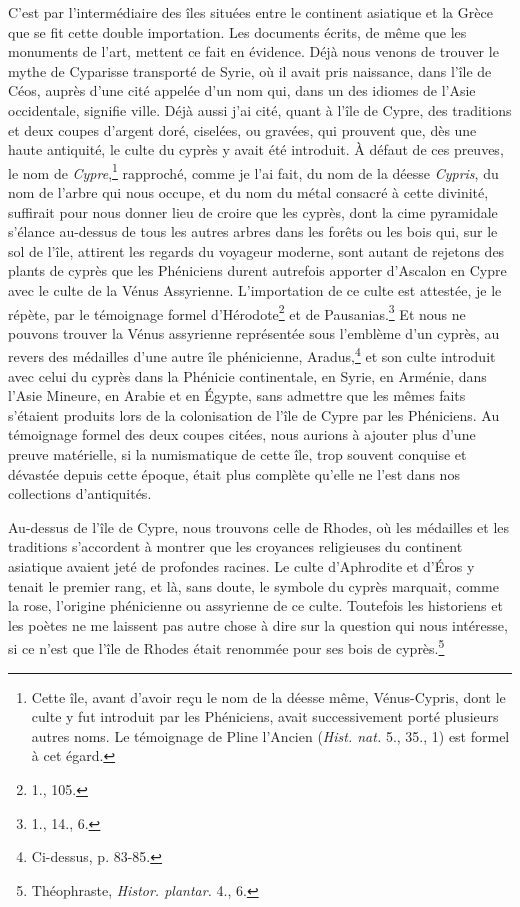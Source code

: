 \documentclass{article}
\begin{document}
C'est par l'intermédiaire des îles situées entre le continent asiatique et la Grèce que se fit cette double importation. Les documents écrits, de même que les monuments de l'art, mettent ce fait en évidence. Déjà nous venons de trouver le mythe de Cyparisse transporté de Syrie, où il avait pris naissance, dans l'île de Céos, auprès d'une cité appelée d'un nom qui, dans un des idiomes de l'Asie occidentale, signifie ville. Déjà aussi j'ai cité, quant à l'île de Cypre, des traditions et deux coupes d'argent doré, ciselées, ou gravées, qui prouvent que, dès une haute antiquité, le culte du cyprès y avait été introduit. À défaut de ces preuves, le nom de \emph{Cypre},\footnote{Cette île, avant d'avoir reçu le nom de la déesse même, Vénus-Cypris, dont le culte y fut introduit par les Phéniciens, avait successivement porté plusieurs autres noms. Le témoignage de Pline l'Ancien (\emph{Hist. nat.} 5., 35., 1) est formel à cet égard.} rapproché, comme je l'ai fait, du nom de la déesse \emph{Cypris}, du nom de l'arbre qui nous occupe, et du nom du métal consacré à cette divinité, suffirait pour nous donner lieu de croire que les cyprès, dont la cime pyramidale s'élance au-dessus de tous les autres arbres dans les forêts ou les bois qui, sur le sol de l'île, attirent les regards du voyageur moderne, sont autant de rejetons des plants de cyprès que les Phéniciens durent autrefois apporter d'Ascalon en Cypre avec le culte de la Vénus Assyrienne. L'importation de ce culte est attestée, je le répète, par le témoignage formel d'Hérodote\footnote{1., 105.} et de Pausanias.\footnote{1., 14., 6.} Et nous ne pouvons trouver la Vénus assyrienne représentée sous l'emblème d'un cyprès, au revers des médailles d'une autre île phénicienne, Aradus,\footnote{Ci-dessus, p. 83-85.} et son culte introduit avec celui du cyprès dans la Phénicie continentale, en Syrie, en Arménie, dans l'Asie Mineure, en Arabie et en Égypte, sans admettre que les mêmes faits s'étaient produits lors de la colonisation de l'île de Cypre par les Phéniciens. Au témoignage formel des deux coupes citées, nous aurions à ajouter plus d'une preuve matérielle, si la numismatique de cette île, trop souvent conquise et dévastée depuis cette époque, était plus complète qu'elle ne l'est dans nos collections d'antiquités.

Au-dessus de l'île de Cypre, nous trouvons celle de Rhodes, où les médailles et les traditions s'accordent à montrer que les croyances religieuses du continent asiatique avaient jeté de profondes racines. Le culte d'Aphrodite et d'Éros y tenait le premier rang, et là, sans doute, le symbole du cyprès marquait, comme la rose, l'origine phénicienne ou assyrienne de ce culte. Toutefois les historiens et les poètes ne me laissent pas autre chose à dire sur la question qui nous intéresse, si ce n'est que l'île de Rhodes était renommée pour ses bois de cyprès.\footnote{Théophraste, \emph{Histor. plantar.} 4., 6.}
\end{document}
